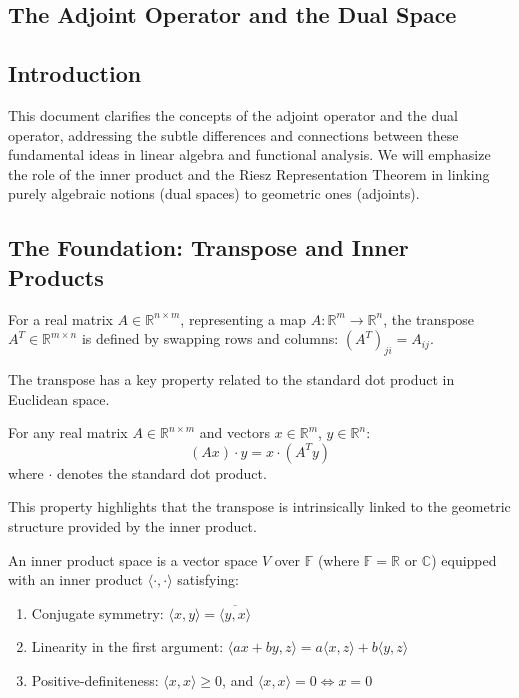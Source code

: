 \begin{notechapter}
\chapter{The Adjoint Operator and the Dual Space}\label{ch:adjoint-operator}

\section{Introduction}
This document clarifies the concepts of the adjoint operator and the dual operator, addressing the subtle differences and connections between these fundamental ideas in linear algebra and functional analysis. We will emphasize the role of the inner product and the Riesz Representation Theorem in linking purely algebraic notions (dual spaces) to geometric ones (adjoints).

\section{The Foundation: Transpose and Inner Products}

\begin{definition}[Transpose]
For a real matrix $A \in \mathbb{R}^{n \times m}$, representing a map $A: \mathbb{R}^m \to \mathbb{R}^n$, the transpose $A^T \in \mathbb{R}^{m \times n}$ is defined by swapping rows and columns: $(A^T)_{ji} = A_{ij}$.
\end{definition}

The transpose has a key property related to the standard dot product in Euclidean space.

\begin{theorem}
For any real matrix $A \in \mathbb{R}^{n \times m}$ and vectors $x \in \mathbb{R}^m$, $y \in \mathbb{R}^n$:
\[
(Ax) \cdot y = x \cdot (A^T y)
\]
where $\cdot$ denotes the standard dot product.
\end{theorem}

This property highlights that the transpose is intrinsically linked to the geometric structure provided by the inner product.

\begin{definition}
An inner product space is a vector space $V$ over $\mathbb{F}$ (where $\mathbb{F} = \mathbb{R}$ or $\mathbb{C}$) equipped with an inner product $\langle \cdot, \cdot \rangle$ satisfying:
\begin{enumerate}
    \item Conjugate symmetry: $\langle x, y \rangle = \overline{\langle y, x \rangle}$
    \item Linearity in the first argument: $\langle ax + by, z \rangle = a\langle x, z \rangle + b\langle y, z \rangle$
    \item Positive-definiteness: $\langle x, x \rangle \geq 0$, and $\langle x, x \rangle = 0 \iff x = 0$
\end{enumerate}
\end{definition}


\end{notechapter}

